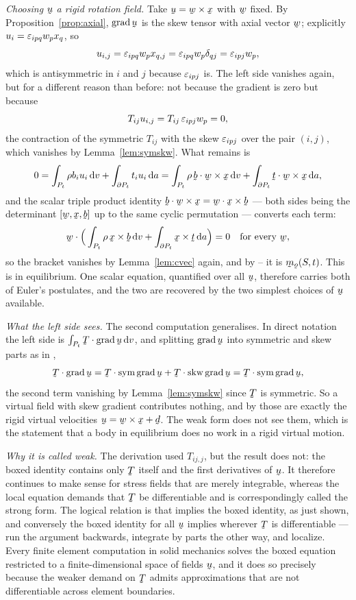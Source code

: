 \begin{solution}
\medskip
\noindent\emph{Choosing $\bu$ a rigid rotation field.}
Take $\bu=\bw\times\bx$ with $\bw$ fixed. By
Proposition~\ref{prop:axial}, $\grad\bu$ is the skew tensor with axial
vector $\bw$; explicitly $u_{i}=\varepsilon_{ipq}w_{p}x_{q}$, so
\[
   u_{i,j}=\varepsilon_{ipq}w_{p}x_{q,j}=\varepsilon_{ipq}w_{p}\delta_{qj}
   =\varepsilon_{ipj}w_{p} ,
\]
which is antisymmetric in $i$ and $j$ because $\varepsilon_{ipj}$ is. The left
side vanishes again, but for a different reason than before: not
because the gradient is zero but because
\[
   T_{ij}u_{i,j}=T_{ij}\,\varepsilon_{ipj}w_{p}=0 ,
\]
the contraction of the symmetric $T_{ij}$ with the skew $\varepsilon_{ipj}$
over the pair $(i,j)$, which vanishes by Lemma~\ref{lem:symskw}. What
remains is
\[
   0=\int_{P_{t}}\rho b_{i}u_{i}\,\dl v
   +\int_{\partial P_{t}}t_{i}u_{i}\,\dl a
   =\int_{P_{t}}\rho\,\ip\bb{\bw\times\bx}\,\dl v
   +\int_{\partial P_{t}}\ip\bt{\bw\times\bx}\,\dl a ,
\]
and the scalar triple product identity
$\ip\bb{\bw\times\bx}=\ip\bw{\bx\times\bb}$ --- both sides being the
determinant $[\bw,\bx,\bb]$ up to the same cyclic permutation ---
converts each term:
\[
   \ip{\bw}{\Big(\int_{P_{t}}\rho\,\bx\times\bb\,\dl v
   +\int_{\partial P_{t}}\bx\times\bt\,\dl a\Big)}=0
   \quad\text{for every }\bw ,
\]
so the bracket vanishes by Lemma~\ref{lem:cvec} again, and by
-- it is $\bm_{\bo}(S,t)$. This is  in
equilibrium. One scalar equation, quantified over all $\bu$, therefore
carries both of Euler's postulates, and the two are recovered by the two
simplest choices of $\bu$ available.

\medskip
\noindent\emph{What the left side sees.}
The second computation generalises. In direct notation the left side is
$\int_{P_{t}}\bT\cdot\grad\bu\,\dl v$, and splitting $\grad\bu$ into
symmetric and skew parts as in ,
\[
   \bT\cdot\grad\bu
   =\bT\cdot\Sym\grad\bu+\bT\cdot\Skw\grad\bu
   =\bT\cdot\Sym\grad\bu ,
\]
the second term vanishing by Lemma~\ref{lem:symskw} since $\bT$ is
symmetric. So a virtual field with skew gradient contributes nothing,
and by  those are exactly the rigid virtual velocities
$\bu=\bw\times\bx+\bd$. The weak form does not see them, which is the
statement that a body in equilibrium does no work in a rigid virtual
motion.

\medskip
\noindent\emph{Why it is called weak.}
The derivation used $T_{ij,j}$, but the result does not: the boxed
identity contains only $\bT$ itself and the first derivatives of $\bu$.
It therefore continues to make sense for stress fields that are merely
integrable, whereas the local equation  demands that $\bT$
be differentiable and is correspondingly called the strong form. The
logical relation is that  implies the boxed identity, as
just shown, and conversely the boxed identity for all $\bu$ implies
 wherever $\bT$ is differentiable --- run the argument
backwards, integrate by parts the other way, and localize. Every finite
element computation in solid mechanics solves the boxed equation
restricted to a finite-dimensional space of fields $\bu$, and it does so
precisely because the weaker demand on $\bT$ admits approximations that
are not differentiable across element boundaries.
\end{solution}

